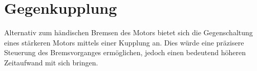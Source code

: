 \section{Gegenkupplung}
\label{gegenkupplung}

Alternativ zum händischen Bremsen des Motors bietet sich die Gegenschaltung eines stärkeren Motors mittels einer Kupplung an.
Dies würde eine präzisere Steuerung des Bremsvorganges ermöglichen, jedoch einen bedeutend höheren Zeitaufwand mit sich bringen.
